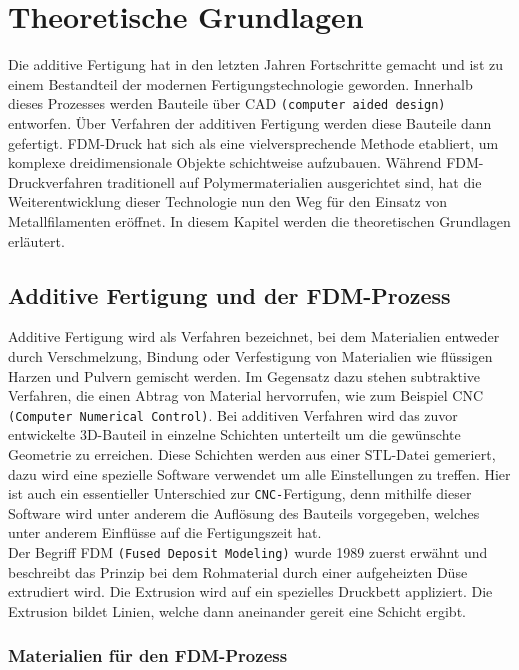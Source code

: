 \chapter{Theoretische Grundlagen}

Die additive Fertigung hat in den letzten Jahren Fortschritte gemacht und ist zu einem Bestandteil der modernen Fertigungstechnologie geworden. Innerhalb dieses Prozesses werden Bauteile über CAD \texttt{(computer aided design)} entworfen. Über Verfahren der additiven Fertigung werden diese Bauteile dann gefertigt. FDM-Druck hat sich als eine vielversprechende Methode etabliert, um komplexe dreidimensionale Objekte schichtweise aufzubauen. Während FDM-Druckverfahren traditionell auf Polymermaterialien ausgerichtet sind, hat die Weiterentwicklung dieser Technologie nun den Weg für den Einsatz von Metallfilamenten eröffnet. In diesem Kapitel werden die theoretischen Grundlagen erläutert.

\section{Additive Fertigung und der FDM-Prozess}

Additive Fertigung wird als Verfahren bezeichnet, bei dem Materialien entweder durch Verschmelzung, Bindung oder Verfestigung von Materialien wie flüssigen Harzen und Pulvern gemischt werden. Im Gegensatz dazu stehen subtraktive Verfahren, die einen Abtrag von Material hervorrufen, wie zum Beispiel CNC \texttt{(Computer Numerical Control)}. Bei additiven Verfahren wird das zuvor entwickelte 3D-Bauteil in einzelne Schichten unterteilt um die gewünschte Geometrie zu erreichen. Diese Schichten werden aus einer STL-Datei gemeriert, dazu wird eine spezielle Software verwendet um alle Einstellungen zu treffen. Hier ist auch ein essentieller Unterschied zur \texttt{CNC-}Fertigung, denn mithilfe dieser Software wird unter anderem die Auflösung des Bauteils vorgegeben, welches unter anderem Einflüsse auf die Fertigungszeit hat.\\
Der Begriff FDM  \texttt{(Fused Deposit Modeling)} wurde 1989 zuerst erwähnt und beschreibt das Prinzip bei dem Rohmaterial durch einer aufgeheizten Düse extrudiert wird. Die Extrusion wird auf ein spezielles Druckbett appliziert. Die Extrusion bildet Linien, welche dann aneinander gereit eine Schicht ergibt.

\autocite{Osama2019}

\subsection{Materialien für den FDM-Prozess}

